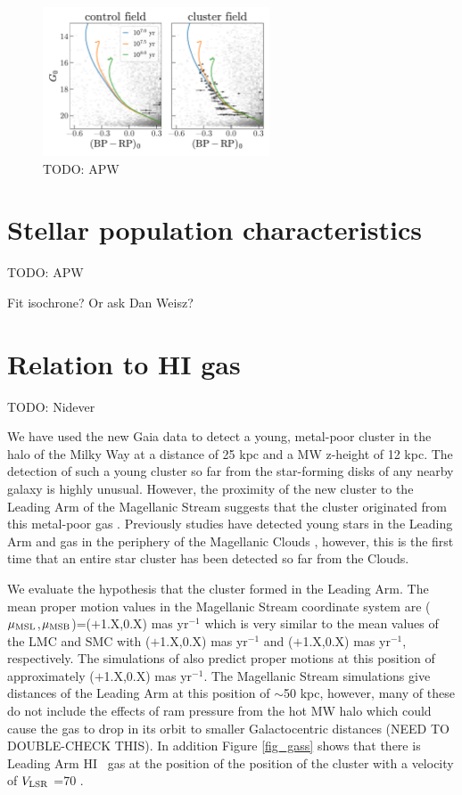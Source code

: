\documentclass[modern]{aastex62}
\newcommand{\todo}[1]{{\color{red} TODO: #1}}
\newcommand{\vlsr}{$V_{\rm LSR}~$}
\newcommand{\hi}{H{\footnotesize I} }
\begin{document}
\begin{figure}
\centering
\includegraphics[width=0.6\textwidth]{figures/pm-members-cmd.pdf}
\caption{\todo{APW}
}
\label{fig:pm-members-cmd}
\end{figure}


\section{Stellar population characteristics}
\label{sec:popchars}

\todo{APW}

Fit isochrone? Or ask Dan Weisz?


\section{Relation to HI gas}
\label{sec:higas}

\todo{Nidever}

We have used the new Gaia data to detect a young, metal-poor cluster in the halo of the Milky Way at a distance of 25 kpc and a MW z-height of 12 kpc.  The detection of such a young cluster so far from the star-forming disks of any nearby
galaxy is highly unusual.  However, the proximity of the new cluster to the Leading Arm of the Magellanic Stream suggests
that the cluster originated from this metal-poor gas \citep{Fox:2018}.  Previously studies have detected young stars in the Leading Arm and gas in the periphery of the Magellanic Clouds \citep{Casetti-Dinescu:2014, MoniBidin:2017}, however, this is the first time that an entire star cluster has been detected so far from the Clouds.

We evaluate the hypothesis that the cluster formed in the Leading Arm.  The mean proper motion values in the Magellanic Stream coordinate system \citep{Nidever:2008} are ($\mu_{\rm MSL}$,$\mu_{\rm MSB}$)=($+$1.X,0.X) mas yr$^{-1}$ which is very similar to the mean values of the LMC and SMC with ($+$1.X,0.X) mas yr$^{-1}$ and ($+$1.X,0.X) mas yr$^{-1}$, respectively.  The simulations of \citet{Besla:2012} also predict proper motions at this position of approximately ($+$1.X,0.X) mas yr$^{-1}$.  The Magellanic Stream simulations give distances of the Leading Arm at this position of $\sim$50 kpc, however, many of these do not include the effects of ram pressure from the hot MW halo which could cause the gas to drop in its orbit to smaller Galactocentric distances (NEED TO DOUBLE-CHECK THIS).  In addition Figure \ref{fig_gass} shows that there is Leading Arm \hi~gas at the position of the position of the cluster with a velocity of \vlsr=70 \kmse.
\end{document}
